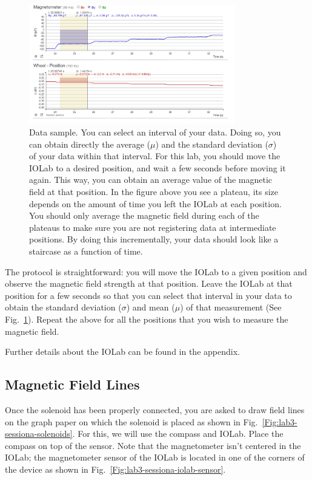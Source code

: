 \documentclass[12pt]{report}
\begin{document}
\begin{figure}[h]
\centering
\includegraphics[width=0.8\textwidth]{iolab-data-selection.PNG}
\caption{Data sample. You can select an interval of your data. Doing so, you can obtain directly the average ($\mu$) and the standard deviation ($\sigma$) of your data within that interval. For this lab, you should move the IOLab to a desired position, and wait a few seconds before moving it again. This way, you can obtain an average value of the magnetic field at that position. In the figure above you see a plateau, its size depends on the amount of time you left the IOLab at each position. You should only average the magnetic field during each of the plateaus to make sure you are not registering data at intermediate positions. By doing this incrementally, your data should look like a staircase as a function of time.}
\label{Fig:lab3-sessiona-iolab-interface2}
\end{figure}

The protocol is straightforward: you will move the IOLab to a given position and observe the magnetic field strength at that position. Leave the IOLab at that position for a few seconds so that you can select that interval in your data to obtain the standard deviation ($\sigma$) and mean ($\mu$) of that measurement (See Fig.~\ref{Fig:lab3-sessiona-iolab-interface2}). Repeat the above for all the positions that you wish to measure the magnetic field.

Further details about the IOLab can be found in the appendix.

\subsection{Magnetic Field Lines}
Once the solenoid has been properly connected, you are asked to draw field lines on the graph paper on which the solenoid is placed as shown in Fig.~\ref{Fig:lab3-sessiona-solenoids}. For this, we will use the compass and IOLab. Place the compass on top of the sensor. Note that the magnetometer isn't centered in the IOLab; the magnetometer sensor of the IOLab is located in one of the corners of the device as shown in Fig.~\ref{Fig:lab3-sessiona-iolab-sensor}.
\end{document}
